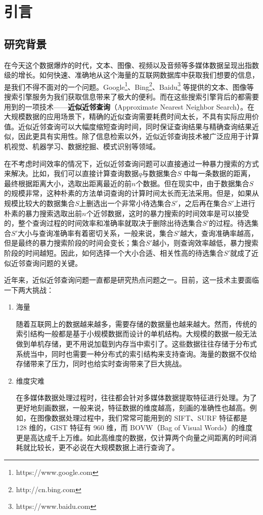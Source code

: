 

\chapter{引言}
\label{cha:introdction}

\section{研究背景}
在今天这个数据爆炸的时代，文本、图像、视频以及音频等多媒体数据呈现出指数级的增长。如何快速、准确地从这个海量的互联网数据库中获取我们想要的信息，是我们不得不面对的一个问题。Google\footnote{https://www.google.com}、Bing\footnote{http://cn.bing.com}、Baidu\footnote{https://www.baidu.com} 等提供的文本、图像等搜索引擎服务为我们获取信息带来了极大的便利。而在这些搜索引擎背后的都需要用到的一项技术——\textbf{近似近邻查询}（Approximate Nearest Neighbor Search）。在大规模数据的应用场景下，精确的近似查询需要耗费时间太长，不具有实际应用价值。近似近邻查询可以大幅度缩短查询时间，同时保证查询结果与精确查询结果近似，因此更具有实用性。除了信息检索以外，近似近邻查询技术被广泛应用于计算机视觉、机器学习、数据挖掘、模式识别等领域。

在不考虑时间效率的情况下，近似近邻查询问题可以直接通过一种暴力搜索的方式来解决。比如，我们可以直接计算查询数据$q$与数据集合$S$ 中每一条数据的距离，最终根据距离大小，选取出距离最近的前$n$个数据。但在现实中，由于数据集合$S$的规模非常，这种朴素的方法单词查询的计算时间太长而无法采用。但是，如果从规模比较大的数据集合$S$上删选出一个非常小待选集合$S'$，之后再在集合$S'$上进行朴素的暴力搜索选取出前$n$个近邻数据，这时的暴力搜索的时间效率是可以接受的，整个查询过程的时间效率和准确率就取决于删除出待选集合$S'$的过程。待选集合$S'$大小与查询准确率有着密切关系，一般来说，集合$S'$越大，查询准确率越高，但是最终的暴力搜索阶段的时间会变长；集合$S'$越小，则查询效率越低，暴力搜索阶段的时间越短。因此，如何选择一个大小合适、相关性高的待选集合$S'$就成了近似近邻查询问题的关键。

近年来，近似近邻查询问题一直都是研究热点问题之一。目前，这一技术主要面临一下两大挑战：
\begin{enumerate}
\item 海量

随着互联网上的数据越来越多，需要存储的数据量也越来越大。然而，传统的索引结构一般都是基于小规模数据而设计的单机结构。大规模的数据一般无法做到单机存储，更不用说加载到内存当中索引了。这些数据往往存储于分布式系统当中，同时也需要一种分布式的索引结构来支持查询。海量的数据不仅给存储带来了压力，同时也给实时查询带来了巨大挑战。
\item 维度灾难

在多媒体数据处理过程时，往往都会针对多媒体数据提取特征进行处理。为了更好地刻画数据，一般来说，特征数据的维度越高，刻画的准确性也越高。例如，在图像数据处理过程中，我们常常可能用到的 SIFT、SURF 特征都是 128 维的，GIST 特征有 960 维，而 BOVW（Bag of Visual Words）的维度更是高达成千上万维。如此高维度的数据，仅计算两个向量之间距离的时间消耗就比较长，更不必说在大规模数据上进行查询了。
\end{enumerate}

